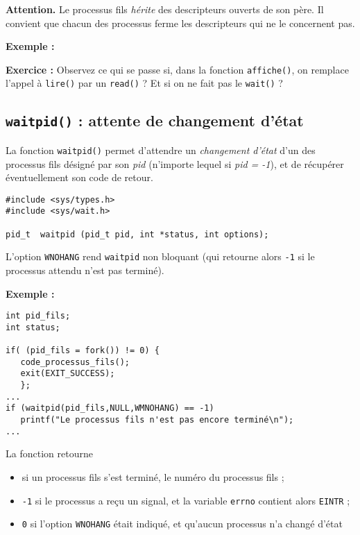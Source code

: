 \textbf{Attention. } Le processus fils \emph{hérite} des descripteurs
ouverts de son père. Il convient que chacun des processus ferme
les descripteurs qui ne le concernent pas.

\textbf{Exemple :}



\source




\textbf{Exercice :} Observez ce qui se passe si, dans la fonction
\texttt{affiche()}, on remplace l'appel à \texttt{lire()} par un
\texttt{read()} ? Et si on ne fait pas le \texttt{wait()} ?

\subsection{ \texttt{waitpid()} : attente de changement d'état}


La fonction \texttt{waitpid()} permet d'attendre un \emph{changement
  d'état} d'un des processus fils désigné par son \emph{pid}
(n'importe lequel si \emph{pid = -1}), et de récupérer éventuellement
son code de retour.


\extrait
\begin{lstlisting}
#include <sys/types.h>
#include <sys/wait.h>

pid_t  waitpid (pid_t pid, int *status, int options);
\end{lstlisting}

L'option \texttt{WNOHANG} rend \texttt{waitpid} non bloquant (qui
retourne alors \texttt{-1} si le processus attendu n'est pas terminé).

\textbf{Exemple :}


\extrait
\begin{lstlisting}
int pid_fils;
int status;

if( (pid_fils = fork()) != 0) {
   code_processus_fils();
   exit(EXIT_SUCCESS);
   };
...
if (waitpid(pid_fils,NULL,WMNOHANG) == -1)
   printf("Le processus fils n'est pas encore terminé\n");
...
\end{lstlisting}


La fonction retourne 
\begin{itemize}
\item
si un processus fils s'est terminé, le numéro du processus fils ;
\item
  \texttt{-1} si le processus a reçu un signal, 
et la variable \texttt{errno} contient alors  \texttt{EINTR} ;
\item
  \texttt{0} si l'option \texttt{WNOHANG} était indiqué, et qu'aucun
  processus n'a changé d'état
\end{itemize}

